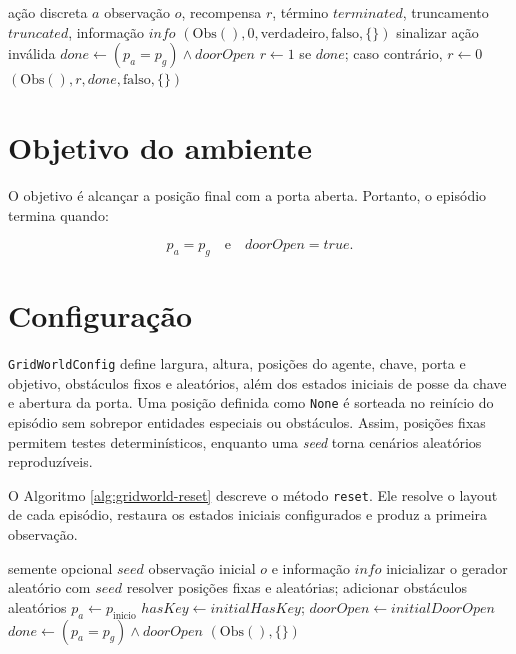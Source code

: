 \begin{algorithm}[H]
\caption{Método \texttt{step} do ambiente GridWorld}
\label{alg:gridworld-step}
\begin{algorithmic}[1]
\Require ação discreta $a$
\Ensure observação $o$, recompensa $r$, término $terminated$, truncamento $truncated$, informação $info$
  \State \Return $(\mathrm{Obs}(), 0, \mathrm{verdadeiro}, \mathrm{falso}, \{\})$
\EndIf
{}
  \State {}
  \State {}
  \State {}
\Else
  \State sinalizar ação inválida
\EndIf
\State $done \gets (p_a=p_g) \land doorOpen$
\State $r \gets 1$ se $done$; caso contrário, $r \gets 0$
\State \Return $(\mathrm{Obs}(), r, done, \mathrm{falso}, \{\})$
\end{algorithmic}
\end{algorithm}

\section{Objetivo do ambiente}

O objetivo é alcançar a posição final com a porta aberta.
Portanto, o episódio termina quando:

\begin{equation}
p_a = p_g
\quad \text{e} \quad
doorOpen = true.
\end{equation}

\section{Configuração}

\texttt{GridWorldConfig} define largura, altura, posições do agente, chave,
porta e objetivo, obstáculos fixos e aleatórios, além dos estados iniciais de
posse da chave e abertura da porta. Uma posição definida como \texttt{None} é
sorteada no reinício do episódio sem sobrepor entidades especiais ou obstáculos.
Assim, posições fixas permitem testes determinísticos, enquanto uma
\textit{seed} torna cenários aleatórios reproduzíveis.

O Algoritmo \ref{alg:gridworld-reset} descreve o método \texttt{reset}.
Ele resolve o layout de cada episódio, restaura os estados iniciais configurados
e produz a primeira observação.

\begin{algorithm}[H]
\caption{Método \texttt{reset} do ambiente GridWorld}
\label{alg:gridworld-reset}
\begin{algorithmic}[1]
\Require semente opcional $seed$
\Ensure observação inicial $o$ e informação $info$
\State inicializar o gerador aleatório com $seed$
\State resolver posições fixas e aleatórias; adicionar obstáculos aleatórios
\State $p_a \gets p_{\mathrm{inicio}}$
\State $hasKey \gets initialHasKey$; $doorOpen \gets initialDoorOpen$
\State $done \gets (p_a=p_g) \land doorOpen$
\State \Return $(\mathrm{Obs}(), \{\})$
\end{algorithmic}
\end{algorithm}


